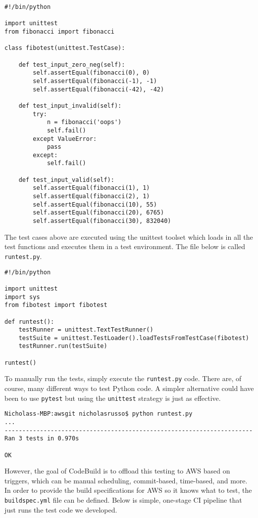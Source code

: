 \begin{verbatim}
#!/bin/python

import unittest
from fibonacci import fibonacci

class fibotest(unittest.TestCase):

    def test_input_zero_neg(self):
        self.assertEqual(fibonacci(0), 0)
        self.assertEqual(fibonacci(-1), -1)
        self.assertEqual(fibonacci(-42), -42)

    def test_input_invalid(self):
        try:
            n = fibonacci('oops')
            self.fail()
        except ValueError:
            pass
        except:
            self.fail()

    def test_input_valid(self):
        self.assertEqual(fibonacci(1), 1)
        self.assertEqual(fibonacci(2), 1)
        self.assertEqual(fibonacci(10), 55)
        self.assertEqual(fibonacci(20), 6765)
        self.assertEqual(fibonacci(30), 832040)
\end{verbatim}

The test cases above are executed using the unittest toolset which loads in
all the test functions and executes them in a test environment. The file
below is called \verb|runtest.py|.

\begin{verbatim}
#!/bin/python

import unittest
import sys
from fibotest import fibotest

def runtest():
    testRunner = unittest.TextTestRunner()
    testSuite = unittest.TestLoader().loadTestsFromTestCase(fibotest)
    testRunner.run(testSuite)

runtest()
\end{verbatim}

To manually run the tests, simply execute the \verb|runtest.py| code. There
are, of course, many different ways to test Python code. A simpler alternative
could have been to use \verb|pytest| but using the \verb|unittest| strategy
is just as effective.

\begin{verbatim}
Nicholass-MBP:awsgit nicholasrusso$ python runtest.py
...
----------------------------------------------------------------------
Ran 3 tests in 0.970s

OK
\end{verbatim}

However, the goal of CodeBuild is to offload this testing to AWS based on
triggers, which can be manual scheduling, commit-based, time-based, and more.
In order to provide the build specifications for AWS so it knows what to test,
the \verb|buildspec.yml| file can be defined. Below is simple, one-stage CI pipeline
that just runs the test code we developed.

